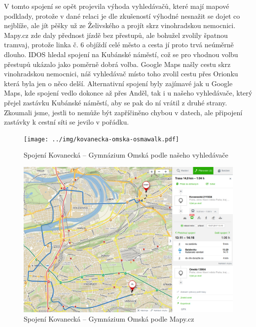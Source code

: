 V tomto spojení se opět projevila výhoda vyhledávačů, které mají mapové
podklady, protože v dané relaci je dle zkušeností výhodné nesnažit se dojet co
nejblíže, ale jít pěšky už ze Želivského a projít skrz vinohradskou nemocnici.
Mapy.cz zde daly přednost jízdě bez přestupů, ale bohužel zvolily špatnou
tramvaj, protože linka č. 6 objíždí celé město a cesta jí proto trvá neúměrně
dlouho. IDOS hledal spojení na Kubánské náměstí, což se pro vhodnou volbu
přestupů ukázalo jako poměrně dobrá volba. Google Maps našly cestu skrz
vinohradskou nemocnici, náš vyhledávač místo toho zvolil cestu přes Orionku
která byla jen o něco delší. Alternativní spojení byly zajímavé jak u Google
Maps, kde spojení vedlo dokonce až přes Anděl, tak i u našeho
vyhledávače, který přejel zastávku Kubánské náměstí, aby se pak do ní vrátil z
druhé strany. Zkoumali jsme, jestli to nemůže být zapříčiněno chybou v datech,
ale připojení zastávky k cestní síti se jevilo v pořádku. 
\begin{figure}[h]
  \centering
    \texttt{[image: ../img/kovanecka-omska-osmawalk.pdf]}
  \caption{Spojení Kovanecká -- Gymnázium Omská podle našeho vyhledávače}
  \label{fig:kovanecka-omska-osmawalk}
\end{figure}
\begin{figure}[h]
  \centering
    \includegraphics[width=\textwidth]{../img/kovanecka-omska-seznam.png}
  \caption{Spojení Kovanecká -- Gymnázium Omská podle Mapy.cz}
  \label{fig:kovanecka-omska-seznam}
\end{figure}
